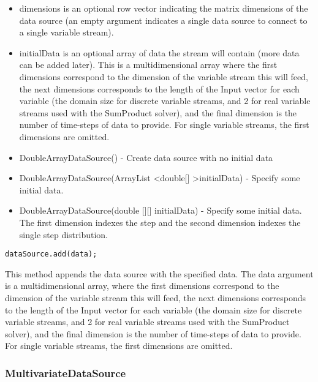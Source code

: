 \begin{itemize}
\item dimensions is an optional row vector indicating the matrix dimensions of the data source (an empty argument indicates a single data source to connect to a single variable stream).
\item initialData is an optional array of data the stream will contain (more data can be added later).  This is a multidimensional array where the first dimensions correspond to the dimension of the variable stream this will feed, the next dimensions corresponds to the length of the Input vector for each variable (the domain size for discrete variable streams, and 2 for real variable streams used with the SumProduct solver), and the final dimension is the number of time-steps of data to provide.  For single variable streams, the first dimensions are omitted.
\end{itemize}
\fi

\ifjava
\begin{itemize}
\item DoubleArrayDataSource() - Create data source with no initial data
\item DoubleArrayDataSource(ArrayList \textless double[] \textgreater  initialData) - Specify some initial data. 
\item DoubleArrayDataSource(double [][] initialData) - Specify some initial data.  The first dimension indexes the step and the second dimension indexes the single step distribution.
\end{itemize}
\fi



\begin{lstlisting}
dataSource.add(data);
\end{lstlisting}

This method appends the data source with the specified data.  The data argument is a multidimensional array, where the first dimensions correspond to the dimension of the variable stream this will feed, the next dimensions corresponds to the length of the Input vector for each variable (the domain size for discrete variable streams, and 2 for real variable streams used with the SumProduct solver), and the final dimension is the number of time-steps of data to provide.  For single variable streams, the first dimensions are omitted.

\subsubsection{MultivariateDataSource}

